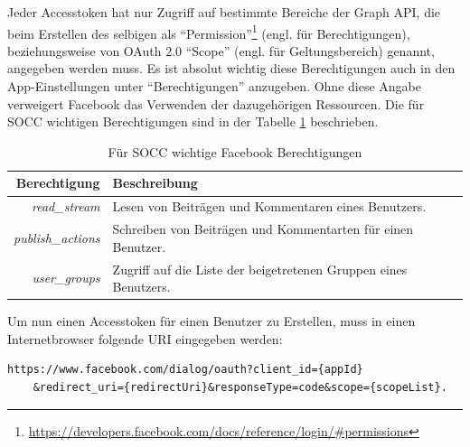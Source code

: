 Jeder Accesstoken hat nur Zugriff auf bestimmte Bereiche der Graph API, die beim Erstellen des selbigen als \enquote{Permission}\footnote{\url{https://developers.facebook.com/docs/reference/login/\#permissions}} (engl. für Berechtigungen), beziehungsweise von OAuth 2.0 \enquote{Scope} (engl. für Geltungsbereich) genannt, angegeben werden muss. Es ist absolut wichtig diese Berechtigungen auch in den App-Einstellungen unter \enquote{Berechtigungen} anzugeben. Ohne diese Angabe verweigert Facebook das Verwenden der dazugehörigen Ressourcen. Die für SOCC wichtigen Berechtigungen sind in der Tabelle \ref{tbl:socc_facebook_persmissons} beschrieben.

\begin{table}[ht]
    \centering
    \caption{Für SOCC wichtige Facebook Berechtigungen}
    \begin{tabular}{r|p{10cm}}
        \textbf{Berechtigung} & 
        \textbf{Beschreibung} \\ 
        \hline
        \textit{read\_stream} & 
        Lesen von Beiträgen und Kommentaren eines Benutzers. \\
        \textit{publish\_actions} & 
        Schreiben von Beiträgen und Kommentarten für einen Benutzer. \\
        \textit{user\_groups} & 
        Zugriff auf die Liste der beigetretenen Gruppen eines Benutzers.
    \end{tabular}
    \label{tbl:socc_facebook_persmissons}
\end{table}

Um nun einen Accesstoken für einen Benutzer zu Erstellen, muss in einen Internetbrowser folgende URI eingegeben werden:

\begin{lstlisting}[numbers=none, belowskip=-18pt]
https://www.facebook.com/dialog/oauth?client_id={appId}
    &redirect_uri={redirectUri}&responseType=code&scope={scopeList}.
\end{lstlisting}

